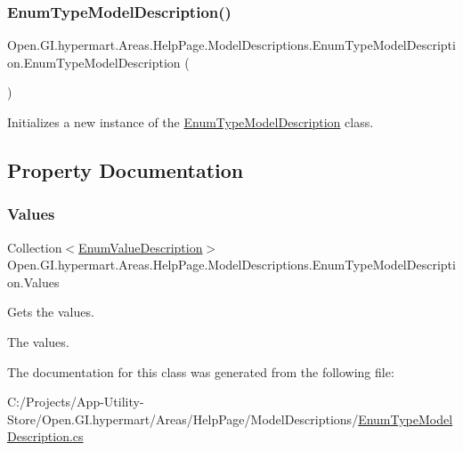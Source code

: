 \subsubsection{\texorpdfstring{Enum\+Type\+Model\+Description()}{EnumTypeModelDescription()}}
{\footnotesize\ttfamily Open.\+G\+I.\+hypermart.\+Areas.\+Help\+Page.\+Model\+Descriptions.\+Enum\+Type\+Model\+Description.\+Enum\+Type\+Model\+Description (\begin{DoxyParamCaption}{ }\end{DoxyParamCaption})}



Initializes a new instance of the \hyperlink{class_open_1_1_g_i_1_1hypermart_1_1_areas_1_1_help_page_1_1_model_descriptions_1_1_enum_type_model_description}{Enum\+Type\+Model\+Description} class. 



\subsection{Property Documentation}
\hypertarget{class_open_1_1_g_i_1_1hypermart_1_1_areas_1_1_help_page_1_1_model_descriptions_1_1_enum_type_model_description_a7b42c1652865a638dd214ba6a1642819}{}\label{class_open_1_1_g_i_1_1hypermart_1_1_areas_1_1_help_page_1_1_model_descriptions_1_1_enum_type_model_description_a7b42c1652865a638dd214ba6a1642819} 
\subsubsection{\texorpdfstring{Values}{Values}}
{\footnotesize\ttfamily Collection$<$\hyperlink{class_open_1_1_g_i_1_1hypermart_1_1_areas_1_1_help_page_1_1_model_descriptions_1_1_enum_value_description}{Enum\+Value\+Description}$>$ Open.\+G\+I.\+hypermart.\+Areas.\+Help\+Page.\+Model\+Descriptions.\+Enum\+Type\+Model\+Description.\+Values\hspace{0.3cm}{\ttfamily [get]}}



Gets the values. 

The values. 

The documentation for this class was generated from the following file\+:\begin{DoxyCompactItemize}
\item 
C\+:/\+Projects/\+App-\/\+Utility-\/\+Store/\+Open.\+G\+I.\+hypermart/\+Areas/\+Help\+Page/\+Model\+Descriptions/\hyperlink{_enum_type_model_description_8cs}{Enum\+Type\+Model\+Description.\+cs}\end{DoxyCompactItemize}
